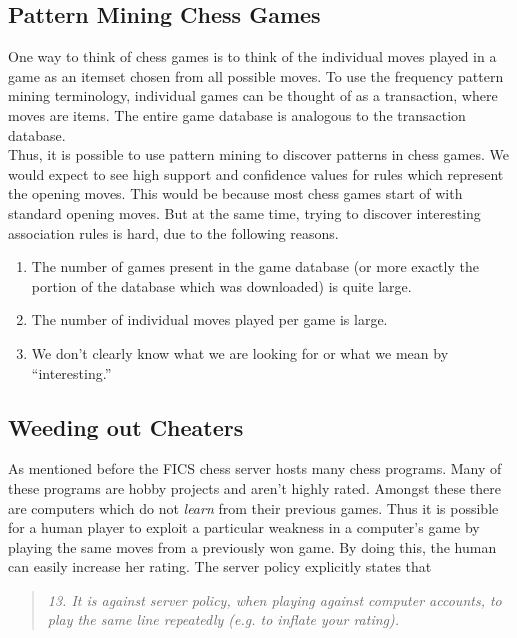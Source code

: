 \documentclass{article}
\begin{document}
\subsection{Pattern Mining Chess Games}
One way to think of chess games is to think of the individual moves
played in a game as an itemset chosen from all possible moves. To use
the frequency pattern mining terminology, individual games can be
thought of as a transaction, where moves are items. The entire game
database is analogous to the transaction database. \\

Thus, it is possible to use pattern mining to discover patterns in
chess games. We would expect to see high support and confidence values
for rules which represent the opening moves. This would be because
most chess games start of with standard opening moves. But at the same
time, trying to discover interesting association rules is hard, due to
the following reasons.

\begin{enumerate}
\item The number of games present in the game database (or more exactly the portion of the database which was downloaded) is quite large. 

\item The number of individual moves played per game is large.

\item We don't clearly know what we are looking for or what we mean by  ``interesting.''

\end{enumerate}

\subsection{Weeding out Cheaters}
As mentioned before the FICS chess server hosts many chess programs. Many of these programs are hobby projects and aren't highly rated. Amongst these there are computers which do not {\sl learn} from their previous games. Thus it is possible for a human player to exploit a particular weakness in a computer's game by playing the same moves from a previously won game. By doing this, the human can easily increase her rating. The server policy explicitly states that \cite{web:ficspolicy}
\begin{quote}
{\sl 13. It is against server policy, when playing against computer accounts, to play the same line repeatedly (e.g. to inflate your rating).}
\end{quote}
\end{document}
